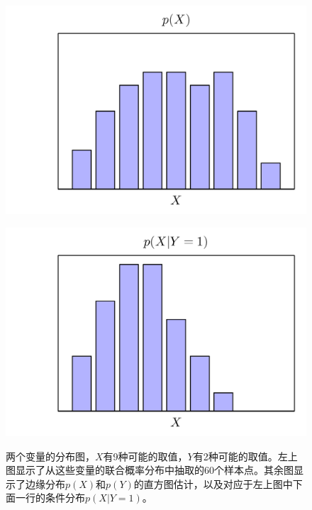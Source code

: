 \documentclass[b5paper]{book}
\numberwithin{equation}{chapter}
\begin{document}
{\begin{figure}[ht]
\begin{minipage}[t]{0.5\linewidth}
		\label{fig:1-11b}
		\end{minipage}\\
		\begin{minipage}[t]{0.5\linewidth}
		\includegraphics[scale=0.8]{Images/1-11c.png}
		\label{fig:1-11c}
		\end{minipage}
		\begin{minipage}[t]{0.5\linewidth}
		\includegraphics[scale=0.8]{Images/1-11d.png}
		\label{fig:1-11d}
		\end{minipage}
		\caption{两个变量的分布图，$X$有9种可能的取值，$Y$有2种可能的取值。左上图显示了从这些变量的联合概率分布中抽取的60个样本点。其余图显示了边缘分布$p(X)$和$p(Y)$的直方图估计，以及对应于左上图中下面一行的条件分布$p(X|Y=1)$。}
	\end{figure}
	\\
}
\end{document}
